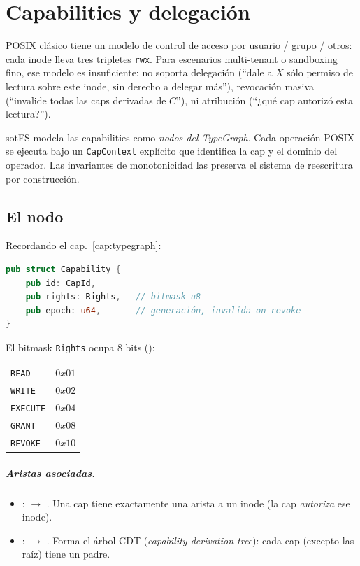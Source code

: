 \chapter{Capabilities y delegación}
\label{cap:capabilities}

POSIX clásico tiene un modelo de control de acceso por usuario / grupo /
otros: cada inode lleva tres tripletes \texttt{rwx}. Para escenarios
multi-tenant o sandboxing fino, ese modelo es insuficiente: no soporta
delegación (``dale a $X$ sólo permiso de lectura sobre este inode, sin
derecho a delegar más''), revocación masiva (``invalide todas las caps
derivadas de $C$''), ni atribución (``¿qué cap autorizó esta lectura?'').

sotFS modela las capabilities como \emph{nodos del TypeGraph}. Cada
operación POSIX se ejecuta bajo un \texttt{CapContext} explícito que
identifica la cap y el dominio del operador. Las invariantes de
monotonicidad las preserva el sistema de reescritura por construcción.

\section{El nodo \NCap}

Recordando el cap.~\ref{cap:typegraph}:

\begin{lstlisting}[language=rust]
pub struct Capability {
    pub id: CapId,
    pub rights: Rights,   // bitmask u8
    pub epoch: u64,       // generación, invalida on revoke
}
\end{lstlisting}

El bitmask \texttt{Rights} ocupa 8 bits
():

\begin{tabular}{ll}
  \texttt{READ}    & $0x01$ \\
  \texttt{WRITE}   & $0x02$ \\
  \texttt{EXECUTE} & $0x04$ \\
  \texttt{GRANT}   & $0x08$ \\
  \texttt{REVOKE}  & $0x10$ \\
\end{tabular}

\paragraph{Aristas asociadas.}

\begin{itemize}
  \item \egrants{}: \NCap{} $\to$ \NInode. Una cap tiene exactamente una
    arista \egrants{} a un inode (la cap \emph{autoriza} ese inode).
  \item \edelegates{}: \NCap{} $\to$ \NCap. Forma el árbol CDT
    (\emph{capability derivation tree}): cada cap (excepto las raíz)
    tiene un padre.
\end{itemize}

